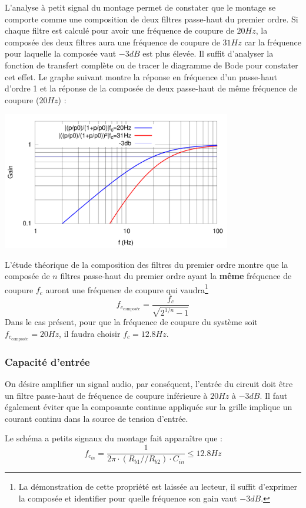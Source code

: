 \documentclass[11pt,a4paper]{article}
\theoremstyle{definition}%
\begin{document}
{L'analyse à petit signal du montage permet de constater que le montage se comporte comme une composition de deux filtres passe-haut du premier ordre. Si chaque filtre est calculé pour avoir une fréquence de coupure de $20Hz$, la composée des deux filtres aura une fréquence de coupure de $31Hz$ car la fréquence pour laquelle la composée vaut $-3dB$ est plus élevée. Il suffit d'analyser la fonction de transfert complète ou de tracer le diagramme de Bode pour constater cet effet. Le graphe suivant montre la réponse en fréquence d'un passe-haut d'ordre 1 et la réponse de la composée de deux passe-haut de même fréquence de coupure ($20Hz$) :
%
\begin{center}
\includegraphics[width=10cm]{bode_corr_20-31.pdf}
\end{center}
%
L'étude théorique de la composition des filtres du premier ordre montre que la composée de $n$ filtres passe-haut du premier ordre ayant la \textbf{même} fréquence de coupure $f_c$ auront une fréquence de coupure qui vaudra\footnote{La démonstration de cette propriété est laissée au lecteur, il suffit d'exprimer la composée et identifier pour quelle fréquence son gain vaut $-3dB$.} $$f_{c_{\mbox{composée}}}=\frac{f_c}{\sqrt{2^{1/n}-1}}$$ Dans le cas présent, pour que la fréquence de coupure du système soit $f_{c_{\mbox{composée}}}=20Hz$, il faudra choisir $f_c=12.8Hz$.

\subsubsection{Capacité d'entrée}
On désire amplifier un signal audio, par conséquent, l'entrée du circuit doit être un filtre passe-haut de fréquence de coupure inférieure à $20Hz$ à $-3dB$. Il faut également éviter que la composante continue appliquée sur la grille implique un courant continu dans la source de tension d'entrée.

Le schéma a petits signaux du montage fait apparaître que :
$$f_{c_{in}}=\frac{1}{2\pi\cdot\left(R_{b1}//R_{b2}\right)\cdot C_{in}}\leq 12.8Hz$$

}
\end{document}
